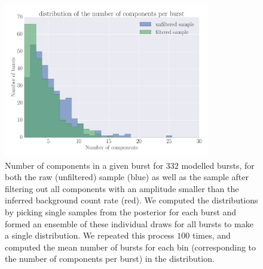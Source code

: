 \documentclass[12pt]{emulateapj}
\begin{document}
\begin{figure}[htbp]
\begin{center}
\includegraphics[width=9cm]{ch6f4.pdf}%
\caption{Number of components in a given burst for $332$ modelled bursts, for both the raw (unfiltered) sample (blue) as well as the sample after
filtering out all components with an amplitude smaller than the inferred background count rate (red). We computed the distributions by picking single samples
from the posterior for each burst and formed an ensemble of these individual draws for all bursts to make a single distribution. We repeated this process $100$ times,
and computed the mean number of bursts for each bin (corresponding to the number of components per burst) in the distribution.}
\label{fig:spikes}
\end{center}
\end{figure}
\end{document}
